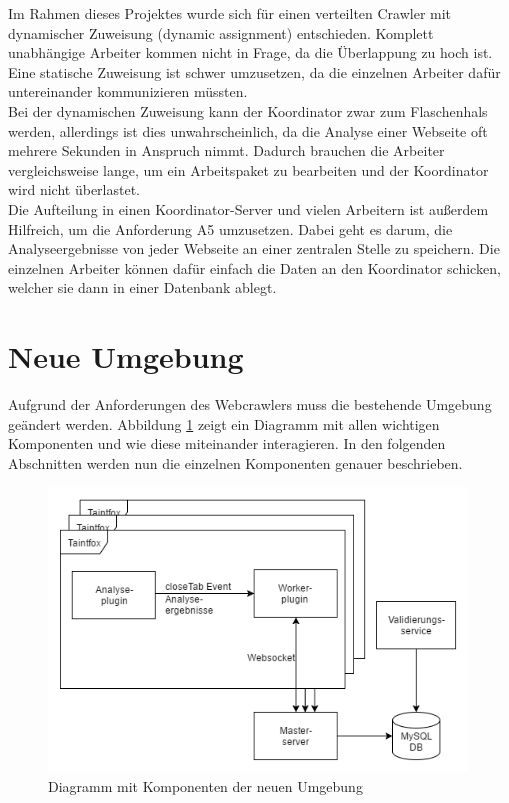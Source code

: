 Im Rahmen dieses Projektes wurde sich für einen verteilten Crawler mit dynamischer Zuweisung (dynamic assignment) entschieden. Komplett unabhängige Arbeiter kommen nicht in Frage, da die Überlappung zu hoch ist. Eine statische Zuweisung ist schwer umzusetzen, da die einzelnen Arbeiter dafür untereinander kommunizieren müssten. \\
Bei der dynamischen Zuweisung kann der Koordinator zwar zum Flaschenhals werden, allerdings ist dies unwahrscheinlich, da die Analyse einer Webseite oft mehrere Sekunden in Anspruch nimmt. Dadurch brauchen die Arbeiter vergleichsweise lange, um ein Arbeitspaket zu bearbeiten und der Koordinator wird nicht überlastet. \\
Die Aufteilung in einen Koordinator-Server und vielen Arbeitern ist außerdem Hilfreich, um die Anforderung A5 umzusetzen. Dabei geht es darum, die Analyseergebnisse von jeder Webseite an einer zentralen Stelle zu speichern. Die einzelnen Arbeiter können dafür einfach die Daten an den Koordinator schicken, welcher sie dann in einer Datenbank ablegt.


\section{Neue Umgebung}
Aufgrund der Anforderungen des Webcrawlers muss die bestehende Umgebung geändert werden. Abbildung \ref{fig:NeueUmgebung} zeigt ein Diagramm mit allen wichtigen Komponenten und wie diese miteinander interagieren. In den folgenden Abschnitten werden nun die einzelnen Komponenten genauer beschrieben.

\begin{figure}
	\centering
	\includegraphics[width=0.99\textwidth]{Bilder/NeueUmgebung.png}
	\caption{Diagramm mit Komponenten der neuen Umgebung}
	\label{fig:NeueUmgebung}
\end{figure}

